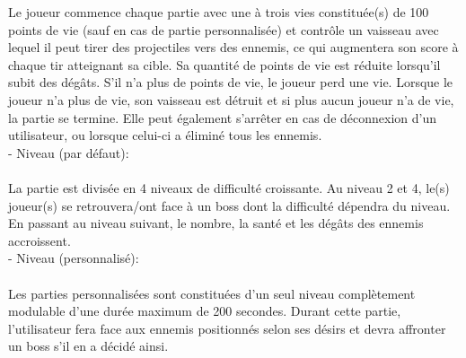 \documentclass[a4paper,12pt]{article}
\begin{document}
Le joueur commence chaque partie avec une à trois vies constituée(s) de 100 points de vie (sauf en cas de partie personnalisée) et
contrôle un vaisseau avec lequel il peut tirer des projectiles vers des ennemis, ce qui 
augmentera son score à chaque tir atteignant sa cible. Sa quantité de points de vie est réduite
lorsqu’il subit des dégâts. S’il n’a plus de points de vie, le joueur perd une vie. Lorsque le 
joueur n’a plus de vie, son vaisseau est détruit et si plus aucun joueur n’a de vie, la partie se 
termine. Elle peut également s’arrêter en cas de déconnexion d’un utilisateur, ou lorsque celui-ci a éliminé tous les ennemis.\\


- Niveau (par défaut):\\ \\
La partie est divisée en 4 niveaux de difficulté croissante. Au niveau 2 et 4, le(s) joueur(s) se retrouvera/ont face à un boss dont la difficulté dépendra du niveau. En passant au niveau suivant, le nombre, la santé et 
les dégâts des ennemis accroissent.\\

- Niveau (personnalisé):\\ \\
Les parties personnalisées sont constituées d'un seul niveau complètement modulable d'une durée maximum de 200 secondes. Durant cette partie, l'utilisateur fera face aux ennemis positionnés selon ses désirs et devra affronter un boss s'il en a décidé ainsi.\\ \\
\end{document}
